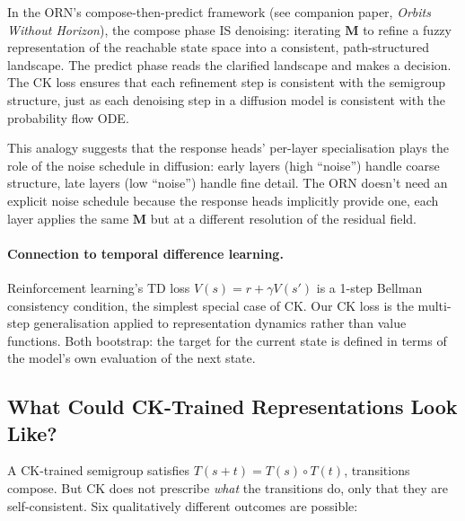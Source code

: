 \documentclass[11pt, a4paper]{article}
\newcommand{\M}{\mathbf{M}}
\theoremstyle{plain}
\theoremstyle{remark}
\begin{document}
In the ORN's compose-then-predict framework (see companion paper, \emph{Orbits Without Horizon}), the compose phase IS denoising: iterating $\M$ to refine a fuzzy representation of the reachable state space into a consistent, path-structured landscape.
The predict phase reads the clarified landscape and makes a decision.
The CK loss ensures that each refinement step is consistent with the semigroup structure, just as each denoising step in a diffusion model is consistent with the probability flow ODE.

This analogy suggests that the response heads' per-layer specialisation plays the role of the noise schedule in diffusion: early layers (high ``noise'') handle coarse structure, late layers (low ``noise'') handle fine detail.
The ORN doesn't need an explicit noise schedule because the response heads implicitly provide one, each layer applies the same $\M$ but at a different resolution of the residual field.

\paragraph{Connection to temporal difference learning.}
Reinforcement learning's TD loss $V(s) = r + \gamma V(s')$ is a 1-step Bellman consistency condition, the simplest special case of CK.
Our CK loss is the multi-step generalisation applied to representation dynamics rather than value functions.
Both bootstrap: the target for the current state is defined in terms of the model's own evaluation of the next state.

\subsection{What Could CK-Trained Representations Look Like?}

A CK-trained semigroup satisfies $T(s{+}t) = T(s) \circ T(t)$, transitions compose.
But CK does not prescribe \emph{what} the transitions do, only that they are self-consistent.
Six qualitatively different outcomes are possible:
\end{document}
